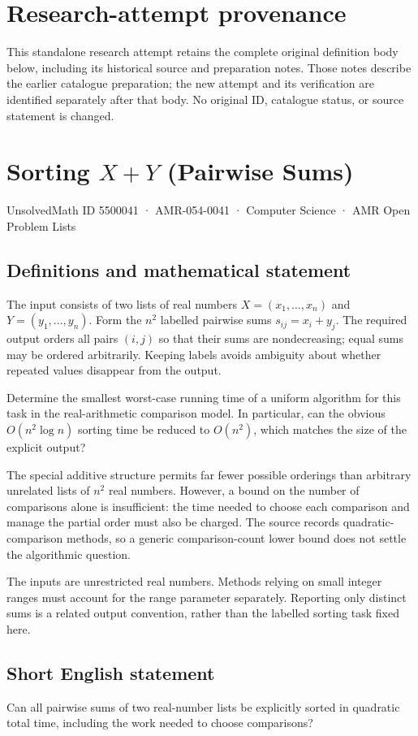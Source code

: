 \documentclass[11pt,a4paper]{article}
\begin{document}
\section*{Research-attempt provenance}
This standalone research attempt retains the complete original definition body below,
including its historical source and preparation notes. Those notes describe the
earlier catalogue preparation; the new attempt and its verification are identified
separately after that body. No original ID, catalogue status, or source statement is changed.

\section*{Sorting $X+Y$ (Pairwise Sums)}\label{5500041}
{\small UnsolvedMath ID 5500041 · AMR-054-0041 · Computer Science · AMR Open Problem Lists}
\subsection{Definitions and mathematical statement}
The input consists of two lists of real numbers
$X=(x_1,\ldots,x_n)$ and $Y=(y_1,\ldots,y_n)$. Form the $n^2$ labelled
pairwise sums $s_{ij}=x_i+y_j$. The required output orders all pairs
$(i,j)$ so that their sums are nondecreasing; equal sums may be
ordered arbitrarily. Keeping labels avoids ambiguity about whether
repeated values disappear from the output.

Determine the smallest worst-case running time of a uniform algorithm
for this task in the real-arithmetic comparison model. In particular,
can the obvious $O(n^2\log n)$ sorting time be reduced to $O(n^2)$,
which matches the size of the explicit output?

The special additive structure permits far fewer possible orderings
than arbitrary unrelated lists of $n^2$ real numbers. However, a
bound on the number of comparisons alone is insufficient: the time
needed to choose each comparison and manage the partial order must
also be charged. The source records quadratic-comparison methods,
so a generic comparison-count lower bound does not settle the
algorithmic question.

The inputs are unrestricted real numbers. Methods relying on small
integer ranges must account for the range parameter separately.
Reporting only distinct sums is a related output convention, rather
than the labelled sorting task fixed here.
\subsection{Short English statement}
Can all pairwise sums of two real-number lists be explicitly sorted
in quadratic total time, including the work needed to choose comparisons?
\end{document}
